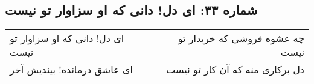 \begin{center}
\section*{شماره ۳۳: ای دل! دانی که او سزاوار تو نیست}
\label{sec:033}
\begin{longtable}{l p{0.5cm} r}
ای دل! دانی که او سزاوار تو نیست
&&
چه عشوه فروشی که خریدار تو نیست
\\
ای عاشق درمانده! بیندیش آخر
&&
دل برکاری منه که آن کار تو نیست
\\
\end{longtable}
\end{center}
